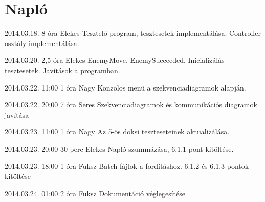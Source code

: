 %
\section{Napló}

\begin{naplo}


\bejegyzes
{2014.03.18.}
{8 óra}
{Elekes}
{Tesztelő program, tesztesetek implementálása.
Controller osztály implementálása.
}

\bejegyzes
{2014.03.20.}
{2,5 óra}
{Elekes}
{EnemyMove, EnemySucceeded, Inicializálás tesztesetek. Javítások a programban.}

\bejegyzes
{2014.03.22. 11:00}
{1 óra}
{Nagy}
{Konzolos menü a szekvenciadiagramok alapján.}

\bejegyzes
{2014.03.22. 20:00}
{7 óra}
{Seres}
{Szekvenciadiagramok és kommunikációs diagramok javítása}

\bejegyzes
{2014.03.23. 11:00}
{1 óra}
{Nagy}
{Az 5-ös doksi teszteseteinek aktualizálása.}

\bejegyzes
{2014.03.23. 20:00}
{30 perc }
{Elekes}
{Napló szummázása, 6.1.1 pont kitöltése.}

\bejegyzes
{2014.03.23. 18:00}
{1 óra}
{Fuksz}
{Batch fájlok a fordításhoz. 6.1.2 és 6.1.3 pontok kitöltése}

\bejegyzes
{2014.03.24. 01:00}
{2 óra}
{Fuksz}
{Dokumentáció véglegesítése}



\end{naplo}

